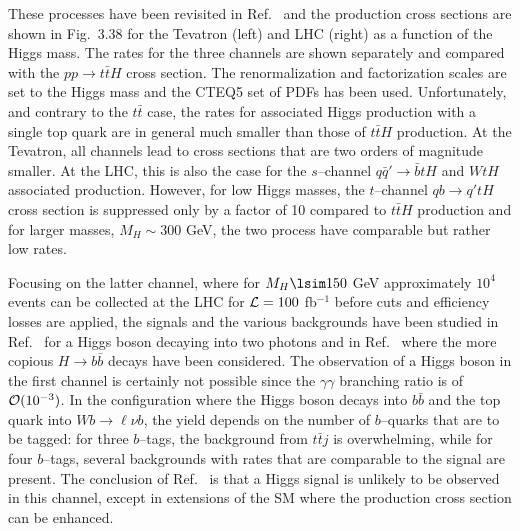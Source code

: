 These processes have been revisited in Ref.~\cite{ppHt-Scott} and the
production cross sections are shown in Fig.~3.38 for the Tevatron (left) and
LHC (right) as a function of the Higgs mass. The rates for the three channels
are shown separately and compared with the $pp \to t\bar t H$ cross section. 
The renormalization and factorization scales are set to the Higgs mass and the
CTEQ5 set of PDFs has been used. Unfortunately, and contrary to the $t\bar t$
case, the rates for associated Higgs production with a single top quark are in
general much smaller than those of $t\bar t H$ production. At the Tevatron, all
channels lead to cross sections that are two orders of magnitude smaller.  At
the LHC, this is also the case for the $s$--channel $q\bar q' \to \bar b tH$
and $Wt H$ associated production.  However, for low Higgs masses, the
$t$--channel $qb \to q' tH$ cross section is suppressed only by a factor of 10
compared to $t\bar t H$ production and for larger masses, $M_H \sim 300$ GeV,
the two process have comparable but rather low rates.  \s

Focusing on the latter channel, where for $M_H \lsim 150$ GeV approximately
$10^4$ events can be collected at the LHC for ${\cal L}= 100$ fb$^{-1}$ before
cuts and efficiency losses are applied, the signals and the various backgrounds
have been studied in Ref.~\cite{ppHt-3oldpapers} for a Higgs boson decaying
into two photons and in Ref.~\cite{ppHt-Scott} where the more copious $H\to
b\bar b$ decays have been considered. The observation of a Higgs
boson in the first channel is certainly not possible since the $\gamma \gamma$
branching ratio is of ${\cal O}(10^{-3})$. In the configuration where the Higgs
boson decays into $b\bar b$ and the top quark into $Wb \to \ell \nu b$, the
yield depends on the number of $b$--quarks that are to be tagged: for
three $b$--tags, the background from $t\bar t j$ is overwhelming, while for
four $b$--tags, several backgrounds with rates that are comparable to the
signal are present.  The conclusion of Ref.~\cite{ppHt-Scott} is that a Higgs
signal is unlikely to be observed in this channel, except in extensions of the
SM where the production cross section can be enhanced.

\begin{figure}[t]
\begin{center}
\vspace*{-0.3cm}
\hspace*{-.02cm}
\mbox{
 
  }
\vspace*{0cm}
\end{center}
\vspace*{-4mm}
\vspace*{-5mm}
\end{figure}


